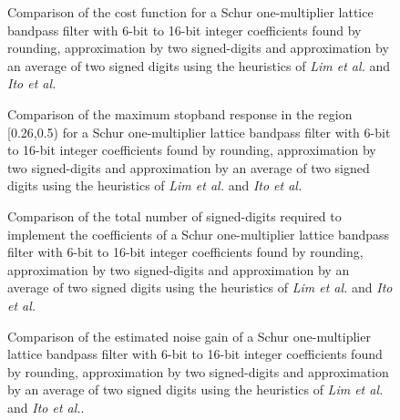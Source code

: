\documentclass[a4paper,twoside,10pt,english]{report}
\begin{document}
\begin{figure}[!htbp]
\begin{center}
\scalebox{0.7}{}
\caption{Comparison of the cost function for a Schur one-multiplier lattice
bandpass filter with 6-bit to 16-bit integer coefficients found by rounding,
approximation by two signed-digits and approximation by an average of two signed
digits using the heuristics of \emph{Lim et al.} and \emph{Ito et al.}}
\label{fig:schurOneMlattice-bandpass-2-allocsd-cost}
\end{center}
\end{figure}
\begin{figure}[!htbp]
\begin{center}
\scalebox{0.7}{}
\caption{Comparison of the maximum stopband response in the region [0.26,0.5)
for a Schur one-multiplier lattice
bandpass filter with 6-bit to 16-bit integer coefficients found by rounding,
approximation by two signed-digits and approximation by an average of two signed
digits using the heuristics of \emph{Lim et al.} and \emph{Ito et al.}}
\label{fig:schurOneMlattice-bandpass-2-allocsd-sidelobe}
\end{center}
\end{figure}
\begin{figure}[!htbp]
\begin{center}
\scalebox{0.7}{}
\caption{Comparison of the total number of signed-digits required to implement
the coefficients of a Schur one-multiplier lattice
bandpass filter with 6-bit to 16-bit integer coefficients found by rounding,
approximation by two signed-digits and approximation by an average of two signed
digits using the heuristics of \emph{Lim et al.} and \emph{Ito et al.}}
\label{fig:schurOneMlattice-bandpass-2-allocsd-used}
\end{center}
\end{figure}
\begin{figure}[!htbp]
\begin{center}
\scalebox{0.7}{}
\caption{Comparison of the estimated noise gain of a Schur one-multiplier lattice
bandpass filter with 6-bit to 16-bit integer coefficients found by rounding,
approximation by two signed-digits and approximation by an average of two signed
digits using the heuristics of \emph{Lim et al.} and \emph{Ito et al.}.}
\label{fig:schurOneMlattice-bandpass-2-allocsd-noise-gain}
\end{center}
\end{figure}
\end{document}
